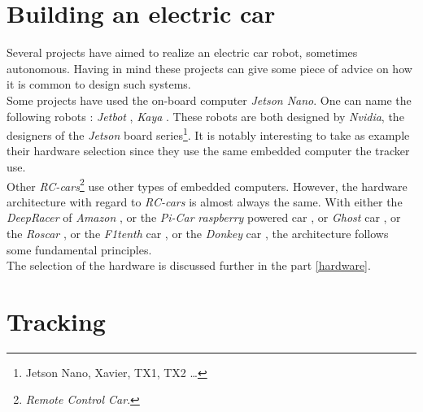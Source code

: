 		\section{Building an electric car}\label{buildingcar}
		
		Several projects have aimed to realize an electric car robot, sometimes autonomous. 
		Having in mind these projects can give some piece of advice on how it is common 
		to design such systems.
		\\\indent Some projects have used the on-board computer \textit{Jetson Nano}. 
		One can name the following robots : \textit{Jetbot} \cite{jetbot}, \textit{Kaya} \cite{kaya}.
		These robots are both designed by \textit{Nvidia}, the designers of the 
		\textit{Jetson} board series\footnote{Jetson Nano, Xavier, TX1, TX2 \dots}. It 
		is notably interesting to take as example their hardware selection since they
		use the same embedded computer the tracker use.
		\\\indent Other \textit{RC-cars}\footnote{\textit{Remote Control Car}.} use other types of embedded computers.
		However, the hardware architecture with regard to \textit{RC-cars} is 
		almost always the same. With either the \textit{DeepRacer} of \textit{Amazon} \cite{deepracer}, or
		the \textit{Pi-Car} \textit{raspberry} powered car \cite{rasp}, or 
		\textit{Ghost} car \cite{ghost}, or the \textit{Roscar} \cite{roscar}, or
		the \textit{F1tenth} car \cite{f1tenth}, or the \textit{Donkey} car \cite{donkey}, the architecture
		follows some fundamental principles.
		\\\indent The selection of the hardware is discussed further in the part \vref{hardware}.
		
		\section{Tracking}\label{statearttracking}
		
